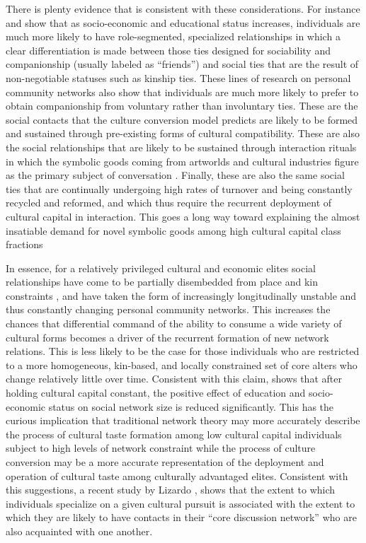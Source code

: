 There is plenty evidence that is consistent with these considerations.  For instance \citet{wellman79, wellman_etal88, wellman_wortley90} and \citet{fischer82} show that as socio-economic and educational status increases, individuals are much more likely to have role-segmented, specialized relationships in which a clear differentiation is made between those ties designed for sociability and companionship (usually labeled as ``friends'') and social ties that are the result of non-negotiable statuses such as kinship ties.  These lines of research on personal community networks also show that individuals are much more likely to prefer to obtain companionship from voluntary rather than involuntary ties.  These are the social contacts that the culture conversion model predicts are likely to be formed and sustained through pre-existing forms of cultural compatibility.  These are also the social relationships that are likely to be sustained through interaction rituals in which the symbolic goods coming from artworlds and cultural industries figure as the primary subject of conversation \citep{cardon_granjon05, dimaggio87}.  Finally, these are also the same social ties that are continually undergoing high rates of turnover and being constantly recycled and reformed, and which thus require the recurrent deployment of cultural capital in interaction.  This goes a long way toward explaining the almost insatiable demand for novel symbolic goods among high cultural capital class fractions \citep{douglas_isherwood96}

In essence, for a relatively privileged cultural and economic elites social relationships have come to be partially disembedded from place and kin constraints \citep{dimaggio_mohr85, holt98}, and have taken the form of increasingly longitudinally unstable and thus constantly changing personal community networks\citep{wellman_etal88}.  This increases the chances that differential command of the ability to consume a wide variety of cultural forms becomes a driver of the recurrent formation of new network relations.  This is less likely to be the case for those  individuals who are restricted to a more homogeneous, kin-based, and locally constrained set of core alters who change relatively little over time.  Consistent with this claim, \citet{lizardo06a} shows that after holding cultural capital constant, the positive effect of education and socio-economic status on social network size is reduced significantly.  This has the curious implication that traditional network theory may more accurately describe the process of cultural taste formation among low cultural capital individuals subject to high levels of network constraint \citep{burt05} while the process of culture conversion may be a more accurate representation of the deployment and operation of cultural taste among culturally advantaged elites.  Consistent with this suggestions, a recent study by Lizardo \citeyearpar{lizardo11}, shows that the extent to which individuals specialize on a given cultural pursuit is associated with the extent to which they are likely to have contacts in their ``core discussion network'' who are also acquainted with one another.
